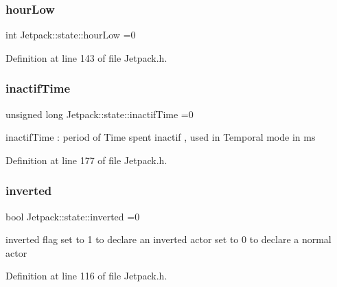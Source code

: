 \mbox{\label{struct_jetpack_1_1state_a9bd1b9e85800cfbec989ce40d1e9e08a}} 
\subsubsection{\texorpdfstring{hour\+Low}{hourLow}}
{\footnotesize\ttfamily int Jetpack\+::state\+::hour\+Low =0}



Definition at line 143 of file Jetpack.\+h.

\mbox{\label{struct_jetpack_1_1state_aaf817b1f9e7a4d65b9e3ca4726b281f6}} 
\subsubsection{\texorpdfstring{inactif\+Time}{inactifTime}}
{\footnotesize\ttfamily unsigned long Jetpack\+::state\+::inactif\+Time =0}

inactif\+Time \+: period of Time spent inactif , used in Temporal mode in ms 

Definition at line 177 of file Jetpack.\+h.

\mbox{\label{struct_jetpack_1_1state_a6bc03bb8f05b10aa142dbb0c39c87fb5}} 
\subsubsection{\texorpdfstring{inverted}{inverted}}
{\footnotesize\ttfamily bool Jetpack\+::state\+::inverted =0}

inverted flag set to 1 to declare an inverted actor set to 0 to declare a normal actor 

Definition at line 116 of file Jetpack.\+h.

\mbox{\label{struct_jetpack_1_1state_a8c26c18b0ec449b7545934cb01cca028}} 
